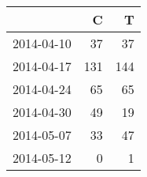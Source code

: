 \begin{tabular}{rrr}
  \hline
 & C & T \\ 
  \hline
2014-04-10 &  37 &  37 \\ 
  2014-04-17 & 131 & 144 \\ 
  2014-04-24 &  65 &  65 \\ 
  2014-04-30 &  49 &  19 \\ 
  2014-05-07 &  33 &  47 \\ 
  2014-05-12 &   0 &   1 \\ 
   \hline
\end{tabular}

